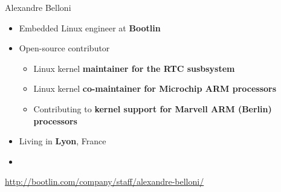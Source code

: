 \begin{frame}{Alexandre Belloni}
    \begin{itemize}
      \item Embedded Linux engineer at {\bf Bootlin}
      \item Open-source contributor
        \begin{itemize}
          \item Linux kernel {\bf maintainer for the RTC susbsystem}
          \item Linux kernel {\bf co-maintainer for Microchip ARM
            processors}
          \item Contributing to {\bf kernel support for Marvell
            ARM (Berlin) processors}
        \end{itemize}
      \item Living in {\bf Lyon}, France
      \item {}
    \end{itemize}
    {\small \url{http://bootlin.com/company/staff/alexandre-belloni/}}
\end{frame}


